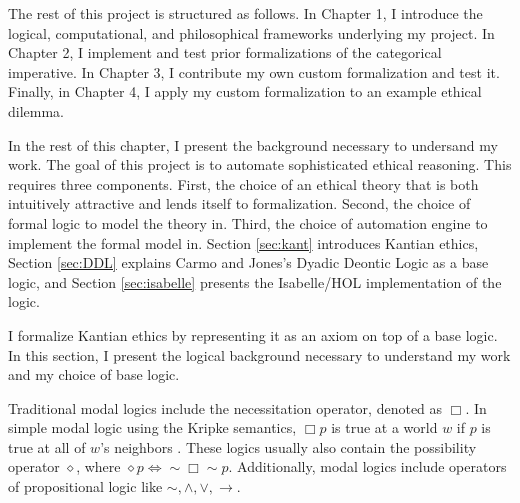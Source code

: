 \begin{isabellebody}
\begin{isamarkuptext}
The rest of this project is structured as follows. In Chapter 1, I introduce the logical, computational, and 
philosophical frameworks underlying my project. In Chapter 2, I implement and test prior formalizations of the categorical
imperative. In Chapter 3, I contribute my own custom formalization and test it. Finally, in Chapter 4, 
I apply my custom formalization to an example ethical dilemma.%
\end{isamarkuptext}\isamarkuptrue%
%
\begin{isamarkuptext}%
In the rest of this chapter, I present the background necessary to undersand my work. The goal 
of this project is to automate sophisticated ethical reasoning. This requires three
components. First, the choice of an ethical theory that is both intuitively attractive and 
lends itself to formalization. Second, the choice of formal logic to model the theory in. Third, the 
choice of automation engine to implement the formal model in. Section \ref{sec:kant} introduces Kantian
ethics, Section \ref{sec:DDL} explains Carmo and Jones's Dyadic Deontic Logic as a 
base logic, and Section \ref{sec:isabelle} presents the Isabelle/HOL implementation of the logic.%
\end{isamarkuptext}\isamarkuptrue%
%

%
\isadelimdocument
%
\endisadelimdocument
%
\isatagdocument
%
\isamarkuptrue%
%
\endisatagdocument
{\isafolddocument}%
%
\isadelimdocument
%
\endisadelimdocument
%
\begin{isamarkuptext}%
I formalize Kantian ethics by representing it as an axiom on top of a base logic. In this section, 
I present the logical background necessary to understand my work and my choice of base logic.%
\end{isamarkuptext}\isamarkuptrue%
%
\isadelimdocument
%
\endisadelimdocument
%
\isatagdocument
%
\isamarkuptrue%
%
\endisatagdocument
{\isafolddocument}%
%
\isadelimdocument
%
\endisadelimdocument
%
\begin{isamarkuptext}%
Traditional modal logics include the necessitation operator, denoted as $\Box$. In simple modal logic
using the Kripke semantics, $\Box p$ is true at a world $w$ if $p$ is true at all of $w$'s neighbors \cite{cresswell}. 
These logics usually also contain the possibility operator $\diamond$, where
 $\diamond p \iff \sim \Box \sim p$. Additionally, modal logics include operators of propositional 
logic like $\sim, \wedge, \vee, \rightarrow$.


\end{isamarkuptext}
\end{isabellebody}
